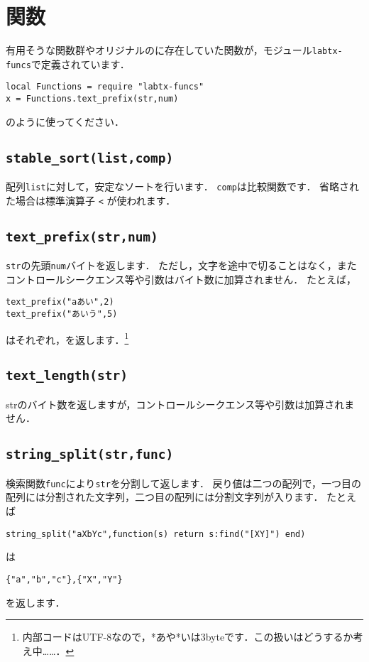 \documentclass[a4paper,lualatex]{jlreq}
\makeatletter
\newcommand{\luafunc}[1]{\texttt{#1}}
\def\luastring{\@ifstar{\luastring@s}{\luastring@}}
\newcommand*{\luastring@s}[1]{``\texttt{#1}''}
\newcommand*{\luavar}[1]{\texttt{#1}}
\makeatother
\begin{document}
\section{関数}\label{sec:関数}
有用そうな関数群やオリジナルの\BibTeX に存在していた関数が，モジュール\luavar{labtx-funcs}で定義されています．
\begin{lstlisting}
local Functions = require "labtx-funcs"
x = Functions.text_prefix(str,num)
\end{lstlisting}
のように使ってください．

\subsection{\luafunc{stable\_sort(list,comp)}}
配列\luavar{list}に対して，安定なソートを行います．
\luavar{comp}は比較関数です．
省略された場合は標準演算子 \luafunc{<} が使われます．

\subsection{\luafunc{text\_prefix(str,num)}}
\luavar{str}の先頭\luavar{num}バイトを返します．
ただし，文字を途中で切ることはなく，またコントロールシークエンス等や引数はバイト数に加算されません．
たとえば，
\begin{lstlisting}
text_prefix("aあい",2)
text_prefix("あいう",5)
\end{lstlisting}
はそれぞれ\luastring{aあ}，\luastring{あい}を返します．\footnote{内部コードはUTF-8なので，\luastring*{あ}や\luastring*{い}は3byteです．この扱いはどうするか考え中……．}

\subsection{\luafunc{text\_length(str)}}
strのバイト数を返しますが，コントロールシークエンス等や引数は加算されません．

\subsection{\luafunc{string\_split(str,func)}}
検索関数\luavar{func}により\luavar{str}を分割して返します．
戻り値は二つの配列で，一つ目の配列には分割された文字列，二つ目の配列には分割文字列が入ります．
たとえば
\begin{lstlisting}
string_split("aXbYc",function(s) return s:find("[XY]") end)
\end{lstlisting}
は
\begin{lstlisting}
{"a","b","c"},{"X","Y"}
\end{lstlisting}
を返します．
\end{document}
